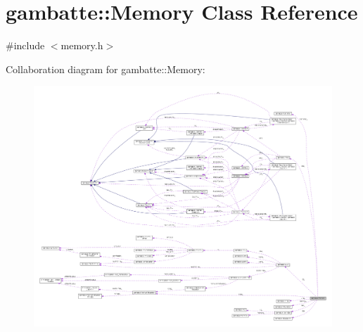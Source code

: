 \hypertarget{classgambatte_1_1Memory}{}\section{gambatte\+:\+:Memory Class Reference}
\label{classgambatte_1_1Memory}


{\ttfamily \#include $<$memory.\+h$>$}



Collaboration diagram for gambatte\+:\+:Memory\+:
\nopagebreak
\begin{figure}[H]
\begin{center}
\leavevmode
\includegraphics[width=350pt]{classgambatte_1_1Memory__coll__graph}
\end{center}
\end{figure}
